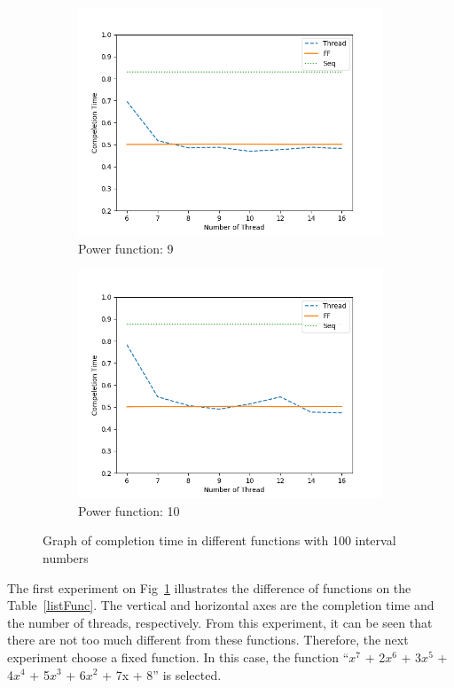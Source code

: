 \documentclass[runningheads,a4paper]{llncs}
\begin{document}
\begin{figure}[t!]
\begin{subfigure}[b]{0.3\textwidth}
		\includegraphics[scale = 0.3]{image/graph/input100/pow09}
		\caption{Power function: 9}
	\end{subfigure}
	\begin{subfigure}[b]{0.3\textwidth}
		\includegraphics[scale = 0.3]{image/graph/input100/pow10}
		\caption{Power function: 10}
	\end{subfigure}
	\caption{Graph of completion time in different functions with 100 interval numbers}
	\label{Fig:powFunc}
\end{figure}
The first experiment on Fig~\ref{Fig:powFunc} illustrates the difference of functions on the Table~\ref{listFunc}. The vertical and horizontal axes are the completion time and the number of threads, respectively.
From this experiment, it can be seen that there are not too much different from these functions. Therefore, the next experiment choose a fixed function. In this case, the function  ``$x^{7}$ + 2$x^{6}$ + 3$x^{5}$ + 4$x^{4}$ + 5$x^{3}$ + 6$x^{2}$ + 7x + 8'' is selected.
\end{document}
